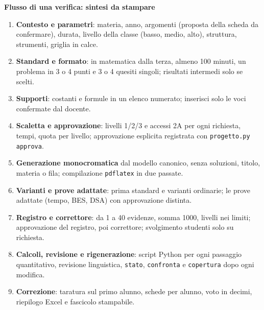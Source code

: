 \documentclass[11pt,a4paper]{article}
\begin{document}
{\Large\bfseries Flusso di una verifica: sintesi da stampare}

\medskip
\begin{enumerate}[itemsep=3pt]
\item \textbf{Contesto e parametri}: materia, anno, argomenti (proposta della scheda da confermare), durata, livello della classe (basso, medio, alto), struttura, strumenti, griglia in calce.
\item \textbf{Standard e formato}: in matematica dalla terza, almeno 100 minuti, un problema in 3 o 4 punti e 3 o 4 quesiti singoli; risultati intermedi solo se scelti.
\item \textbf{Supporti}: costanti e formule in un elenco numerato; inserisci solo le voci confermate dal docente.
\item \textbf{Scaletta e approvazione}: livelli 1/2/3 e accessi 2A per ogni richiesta, tempi, quota per livello; approvazione esplicita registrata con \texttt{progetto.py approva}.
\item \textbf{Generazione monocromatica} dal modello canonico, senza soluzioni, titolo, materia o fila; compilazione \texttt{pdflatex} in due passate.
\item \textbf{Varianti e prove adattate}: prima standard e varianti ordinarie; le prove adattate (tempo, BES, DSA) con approvazione distinta.
\item \textbf{Registro e correttore}: da 1 a 40 evidenze, somma 1000, livelli nei limiti; approvazione del registro, poi correttore; svolgimento studenti solo su richiesta.
\item \textbf{Calcoli, revisione e rigenerazione}: script Python per ogni passaggio quantitativo, revisione linguistica, \texttt{stato}, \texttt{confronta} e \texttt{copertura} dopo ogni modifica.
\item \textbf{Correzione}: taratura sul primo alunno, schede per alunno, voto in decimi, riepilogo Excel e fascicolo stampabile.
\end{enumerate}
\end{document}

